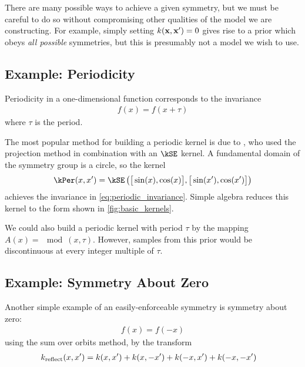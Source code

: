 %
There are many possible ways to achieve a given symmetry, but we must be careful to do so without compromising other qualities of the model we are constructing.
For example, simply setting $k({\bf{x}}, {\bf{x}}') = 0$ gives rise to a \gp{} prior which obeys \emph{all possible} symmetries, but this is presumably not a model we wish to use.






\subsection{Example: Periodicity}

Periodicity in a one-dimensional function corresponds to the invariance
%
\begin{align}
f(x) = f( x + \tau)
\label{eq:periodic_invariance}
\end{align}
%
where $\tau$ is the period.

The most popular method for building a periodic kernel is due to \citet{mackay1998introduction}, who used the projection method in combination with an $\kSE$ kernel.
A fundamental domain of the symmetry group is a circle, so the kernel
%
%
\begin{align}
\kPer(x, x') = \kSE \left( \big[ \sin(x), \cos(x) \big], \big[ \sin(x'), \cos(x') \big] \right)
\end{align}
%
achieves the invariance in \cref{eq:periodic_invariance}.
Simple algebra reduces this kernel to the form shown in \cref{fig:basic_kernels}.

We could also build a periodic kernel with period $\tau$ by the mapping $A(x) = \mod(x, \tau)$.
However, samples from this prior would be discontinuous at every integer multiple of $\tau$.

\subsection{Example: Symmetry About Zero}

Another simple example of an easily-enforceable symmetry is symmetry about zero:
%
\begin{align}
f(x) = f( -x)
\end{align}
%
using the sum over orbits method, by the transform
%
\begin{align}
k_{\textnormal{reflect}}(x, x') & = k(x, x') + k(x, -x') + k(-x, x') + k(-x, -x')
\end{align}

